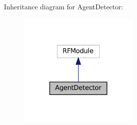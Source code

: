 Inheritance diagram for Agent\+Detector\+:
\nopagebreak
\begin{figure}[H]
\begin{center}
\leavevmode
\includegraphics[width=167pt]{classAgentDetector__inherit__graph}
\end{center}
\end{figure}

